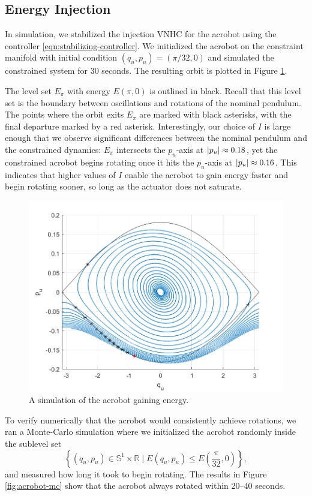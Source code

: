 \documentclass[journal,twoside,web, twocolumn,draftcls]{ieeecolor}
\DeclarePairedDelimiter{\abs}{\lvert}{\rvert}
\newcommand*{\R}{\mathbb{R}}
\newcommand*{\Sone}{\mathbb{S}^1}
\newcommand*{\SxR}{\Sone \times \R}
\begin{document}
\subsection{Energy Injection}

In simulation, we stabilized the injection VNHC for the acrobot using the
controller \eqref{eqn:stabilizing-controller}.
We initialized the acrobot on the constraint manifold
with initial condition \((q_u,p_u) = \left(\pi/32,0 \right)\) and simulated the
constrained system for \(30\) seconds.
The resulting orbit is plotted in Figure
\ref{fig:acrobot-in-orbit}.

The level set \(E_\pi\) with energy \(E(\pi,0)\) is outlined in black.
Recall that this level set is the boundary between oscillations and rotations of the
nominal pendulum.
The points where the orbit exits \(E_\pi\) are marked with black asterisks,
with the final departure marked by a red asterisk.
Interestingly, our choice of \(I\) is large enough that we observe significant
differences between the nominal pendulum and the constrained dynamics:
\(E_\pi\) intersects the \(p_u\)-axis at \(\abs{p_u} \approx 0.18\), yet the
constrained acrobot begins rotating once it hits the
\(p_u\)-axis at \(\abs{p_u} \approx 0.16\). 
This indicates that higher values of \(I\) enable the acrobot to gain energy
faster and begin rotating sooner, so long as the actuator does not saturate.

\begin{figure}[]
    \centering
    \includegraphics[width=0.8\linewidth]{acrobot_in_orbit.png}
    \caption{A simulation of the acrobot gaining energy.}
    \label{fig:acrobot-in-orbit}
\end{figure}

To verify numerically that the acrobot would consistently achieve rotations, we
ran a Monte-Carlo \cite{montecarlo} simulation where we initialized the acrobot
randomly inside the sublevel set
\[
    \left\{(q_u,p_u) \in \SxR \mid
    E(q_u,p_u) \leq E\left(\frac{\pi}{32},0\right)\right\}
    ,
\] 
and measured how long it took to begin rotating.
The results in Figure \ref{fig:acrobot-mc} show that
the acrobot always rotated within 20--40 seconds.
\end{document}
